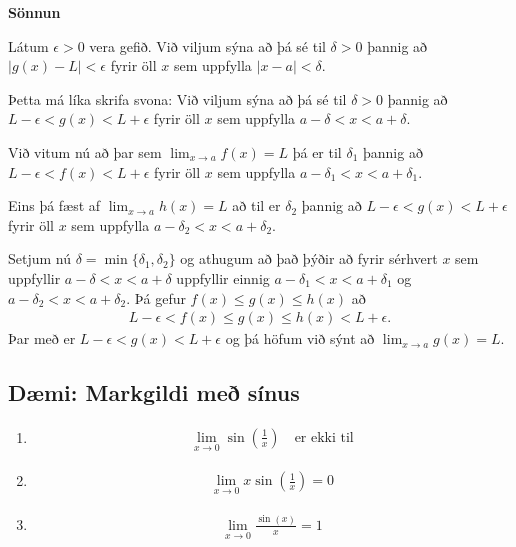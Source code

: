 \documentclass[b5paper,11pt,icelandic]{sphinxmanual}
\begin{document}
\textbf{Sönnun}

Látum \(\epsilon>0\) vera gefið. Við viljum sýna að þá sé til \(\delta>0\) þannig
að \(|g(x)-L|<\epsilon\) fyrir öll \(x\) sem uppfylla \(|x-a|<\delta\).

Þetta má líka skrifa svona:
Við viljum sýna að þá sé til \(\delta>0\) þannig
að \(L-\epsilon<g(x)<L+\epsilon\) fyrir öll \(x\) sem uppfylla \(a-\delta < x<a+\delta\).

Við vitum nú að þar sem \(\lim_{x\to a} f(x) = L\) þá er til \(\delta_1\)
þannig að \(L-\epsilon<f(x)<L+\epsilon\) fyrir öll \(x\) sem uppfylla \(a-\delta_1 < x<a+\delta_1\).

Eins þá fæst af \(\lim_{x\to a} h(x) = L\) að til er \(\delta_2\)
þannig að \(L-\epsilon<g(x)<L+\epsilon\) fyrir öll \(x\) sem uppfylla \(a-\delta_2 < x<a+\delta_2\).

Setjum nú \(\delta = \min\{\delta_1,\delta_2\}\) og athugum að það þýðir að fyrir sérhvert \(x\) sem
uppfyllir \(a-\delta < x < a+\delta\) uppfyllir einnig \(a-\delta_1 < x<a+\delta_1\)
og \(a-\delta_2 < x<a+\delta_2\). Þá gefur \(f(x)\leq g(x)\leq h(x)\) að
\begin{equation*}
\begin{split}L-\epsilon<f(x) \leq g(x) \leq h(x) < L+\epsilon.\end{split}
\end{equation*}
Þar með er \(L-\epsilon < g(x) < L+\epsilon\) og þá höfum við sýnt að
\(\lim_{x\to a} g(x) = L\).


\subsection{Dæmi: Markgildi með sínus}
\label{kafli02:daemi-markgildi-me-sinus}\begin{enumerate}
\item {} \begin{equation*}
\begin{split}\lim_{x\to 0} \sin\left(\frac 1x\right) \quad \text{er ekki til}\end{split}
\end{equation*}
\item {} \begin{equation*}
\begin{split}\lim_{x\to 0} x\sin\left(\frac 1x\right) = 0\end{split}
\end{equation*}
\item {} \begin{equation*}
\begin{split}\lim_{x \to 0} \frac{\sin(x)}{x} = 1\end{split}
\end{equation*}
\end{enumerate}
\end{document}
